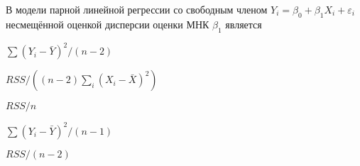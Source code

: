 
\begin{question}
В модели парной линейной регрессии со свободным членом
\(Y_i = \beta_0 + \beta_1 X_i + \varepsilon_i\) несмещённой оценкой
дисперсии оценки МНК \(\hat\beta_1\) является
\begin{answerlist}
  \item \(\sum (Y_i - \bar Y)^2 / (n-2)\)
  \item \(RSS/((n-2)\sum_i (X_i - \bar X)^2)\)
  \item \(RSS/n\)
  \item \(\sum (Y_i - \bar Y)^2 / (n-1)\)
  \item \(RSS/(n-2)\)
\end{answerlist}
\end{question}



